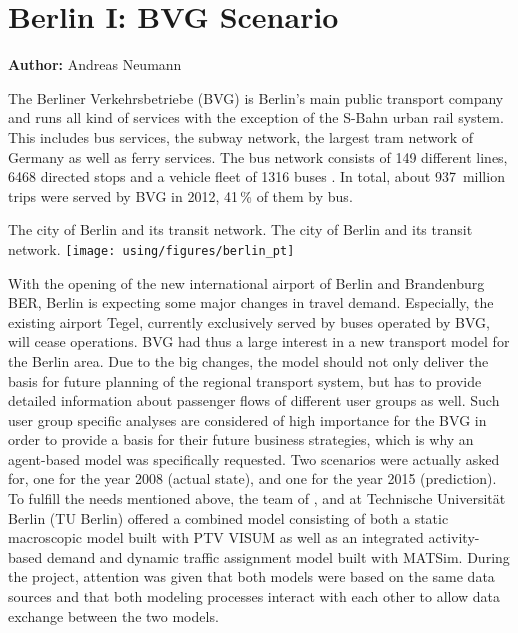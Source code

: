 \section{Berlin I: BVG Scenario}
\label{ch:scenarios:berlinI}
\hfill \textbf{Author:} Andreas Neumann

The Berliner Verkehrsbetriebe (BVG) is Berlin's main public transport company
and runs all kind of services with the exception of the S-Bahn urban rail
system. This includes bus services, the subway network, the largest tram network
of Germany as well as ferry services. The bus network consists of 149
different lines, 6468 directed stops and a vehicle fleet of 1316 buses \citep{BVG2012}.
In total, about 937~million trips were served by BVG in 2012,
41\,\% of them by bus.

\createfigure%
{The city of Berlin and its transit network.}%
{The city of Berlin and its transit network.}%
{\label{fig:scenario_berlin_i}}%
{\texttt{[image: using/figures/berlin\_pt]}}%
{}

With the opening of the new international airport of Berlin and Brandenburg BER,
Berlin is expecting some major changes in travel demand. Especially, the
existing airport Tegel, currently exclusively served by buses operated by BVG,
will cease operations. BVG had thus a large interest in a new transport model
for the Berlin area. Due to the big changes, the model should not only deliver
the basis for future planning of the regional transport system, but has to
provide detailed information about passenger flows of different user groups as
well. Such user group specific analyses are considered of high importance for
the BVG in order to provide a basis for their future business strategies, which
is why an agent-based model was specifically requested. Two scenarios were
actually asked for, one for the year 2008 (actual state), and one for the year
2015 (prediction). To fulfill the needs mentioned above, the team of 
\citet{PTV2013}, \citet{Senozon2013} and \citet{VSP2013} at Technische Universit{\"a}t Berlin (TU Berlin)
offered a combined model consisting of both a static macroscopic model built with
PTV VISUM \citep{VISUM2013} as well as an integrated activity-based demand and
dynamic traffic assignment model built with MATSim. During
the project, attention was given that both models were based on the same data
sources and that both modeling processes interact with each other to allow data
exchange between the two models.

